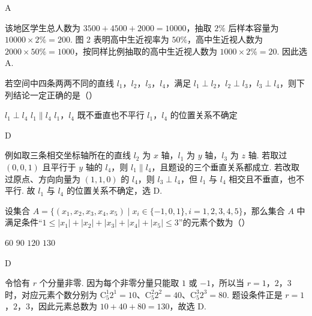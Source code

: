 \begin{answer}
A
\end{answer}

\begin{solution}
该地区学生总人数为 \(3500+4500+2000=10000\)，抽取 \(2\%\) 后样本容量为
\(10000\times2\%=200\). 图 2 表明高中生近视率为 \(50\%\)，高中生近视人数为 \(2000\times50\%=1000\)，按同样比例抽取的高中生近视人数为 \(1000\times2\%=20\). 因此选 A.
\end{solution}

\begin{problem}
若空间中四条两两不同的直线 \(l_{1}\)，\(l_{2}\)，\(l_{3}\)，\(l_{4}\)，满足 \(l_{1} \perp l_{2}\)，\(l_{2} \perp l_{3}\)，\(l_{3} \perp l_{4}\)，则下列结论一定正确的是（\quad）

\choices
    {\(l_{1} \perp l_{4}\)}
    {\(l_{1} \parallel l_{4}\)}
    {\(l_{1}\)，\(l_{4}\) 既不垂直也不平行}
    {\(l_{1}\)，\(l_{4}\) 的位置关系不确定}
\end{problem}

\begin{answer}
D
\end{answer}

\begin{solution}
例如取三条相交坐标轴所在的直线
\(l_2\) 为 \(x\) 轴，\(l_1\) 为 \(y\) 轴，\(l_3\) 为 \(z\) 轴. 若取过 \((0,0,1)\) 且平行于 \(y\) 轴的 \(l_4\)，则 \(l_1\parallel l_4\)，且题设的三个垂直关系都成立. 若改取过原点、方向向量为 \((1,1,0)\) 的 \(l_4\)，则 \(l_3\perp l_4\)，但 \(l_1\) 与 \(l_4\) 相交且不垂直，也不平行. 故 \(l_1\) 与 \(l_4\) 的位置关系不确定，选 D.
\end{solution}

\begin{problem}
设集合 \(A = \{(x_{1}, x_{2}, x_{3}, x_{4}, x_{5}) \mid x_{i} \in \{-1, 0, 1\}, i = 1, 2, 3, 4, 5\}\)，那么集合 \(A\) 中满足条件“\(1 \leqslant |x_{1}| + |x_{2}| + |x_{3}| + |x_{4}| + |x_{5}| \leqslant 3\)”的元素个数为（\quad）

\choices
    {\(60\)}
    {\(90\)}
    {\(120\)}
    {\(130\)}
\end{problem}

\begin{answer}
D
\end{answer}

\begin{solution}
令恰有 \(r\) 个分量非零. 因为每个非零分量只能取 \(1\) 或 \(-1\)，所以当 \(r=1\)，\(2\)，\(3\) 时，对应元素个数分别为
\(\mathrm C_5^1 2^1=10\)、\(\mathrm C_5^2 2^2=40\)、\(\mathrm C_5^3 2^3=80\). 题设条件正是 \(r=1\)，\(2\)，\(3\)，因此元素总数为
\(10+40+80=130\)，故选 D.
\end{solution}

